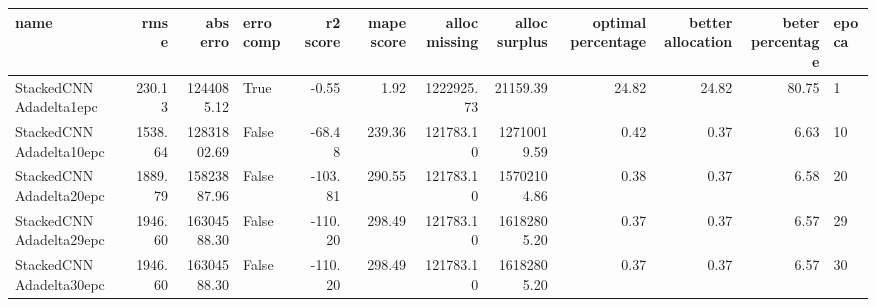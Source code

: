 \begin{tabular}{lrrlrrrrrrrl}
\toprule
name & rmse & abs erro & erro comp & r2 score & mape score & alloc missing & alloc surplus & optimal percentage & better allocation & beter percentage & epoca \\
\midrule
StackedCNN Adadelta1epc & 230.13 & 1244085.12 & True & -0.55 & 1.92 & 1222925.73 & 21159.39 & 24.82 & 24.82 & 80.75 & 1 \\
StackedCNN Adadelta10epc & 1538.64 & 12831802.69 & False & -68.48 & 239.36 & 121783.10 & 12710019.59 & 0.42 & 0.37 & 6.63 & 10 \\
StackedCNN Adadelta20epc & 1889.79 & 15823887.96 & False & -103.81 & 290.55 & 121783.10 & 15702104.86 & 0.38 & 0.37 & 6.58 & 20 \\
StackedCNN Adadelta29epc & 1946.60 & 16304588.30 & False & -110.20 & 298.49 & 121783.10 & 16182805.20 & 0.37 & 0.37 & 6.57 & 29 \\
StackedCNN Adadelta30epc & 1946.60 & 16304588.30 & False & -110.20 & 298.49 & 121783.10 & 16182805.20 & 0.37 & 0.37 & 6.57 & 30 \\
\bottomrule
\end{tabular}
